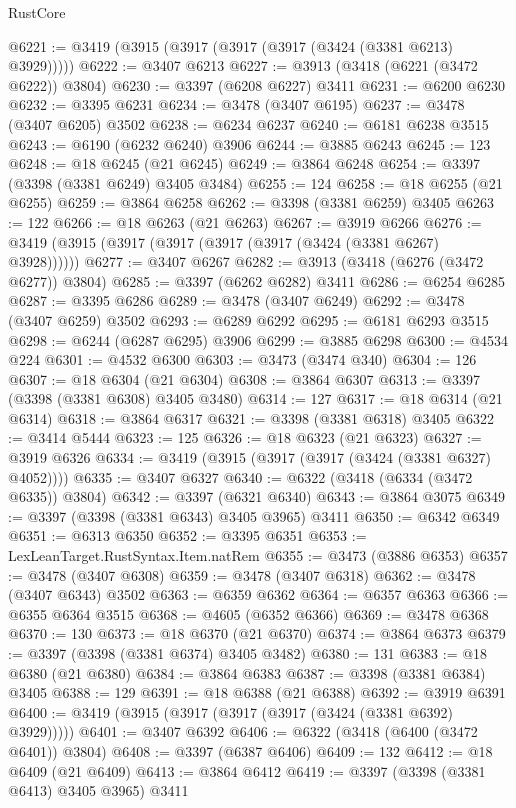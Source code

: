 \begin{lexlean}{RustCore}
\begin{coremodule}
@6221 := @3419 (@3915 (@3917 (@3917 (@3917 (@3424 (@3381 @6213) @3929)))))
@6222 := @3407 @6213
@6227 := @3913 (@3418 (@6221 (@3472 @6222)) @3804)
@6230 := @3397 (@6208 @6227) @3411
@6231 := @6200 @6230
@6232 := @3395 @6231
@6234 := @3478 (@3407 @6195)
@6237 := @3478 (@3407 @6205) @3502
@6238 := @6234 @6237
@6240 := @6181 @6238 @3515
@6243 := @6190 (@6232 @6240) @3906
@6244 := @3885 @6243
@6245 := 123
@6248 := @18 @6245 (@21 @6245)
@6249 := @3864 @6248
@6254 := @3397 (@3398 (@3381 @6249) @3405 @3484)
@6255 := 124
@6258 := @18 @6255 (@21 @6255)
@6259 := @3864 @6258
@6262 := @3398 (@3381 @6259) @3405
@6263 := 122
@6266 := @18 @6263 (@21 @6263)
@6267 := @3919 @6266
@6276 := @3419 (@3915 (@3917 (@3917 (@3917 (@3917 (@3424 (@3381 @6267) @3928))))))
@6277 := @3407 @6267
@6282 := @3913 (@3418 (@6276 (@3472 @6277)) @3804)
@6285 := @3397 (@6262 @6282) @3411
@6286 := @6254 @6285
@6287 := @3395 @6286
@6289 := @3478 (@3407 @6249)
@6292 := @3478 (@3407 @6259) @3502
@6293 := @6289 @6292
@6295 := @6181 @6293 @3515
@6298 := @6244 (@6287 @6295) @3906
@6299 := @3885 @6298
@6300 := @4534 @224
@6301 := @4532 @6300
@6303 := @3473 (@3474 @340)
@6304 := 126
@6307 := @18 @6304 (@21 @6304)
@6308 := @3864 @6307
@6313 := @3397 (@3398 (@3381 @6308) @3405 @3480)
@6314 := 127
@6317 := @18 @6314 (@21 @6314)
@6318 := @3864 @6317
@6321 := @3398 (@3381 @6318) @3405
@6322 := @3414 @5444
@6323 := 125
@6326 := @18 @6323 (@21 @6323)
@6327 := @3919 @6326
@6334 := @3419 (@3915 (@3917 (@3917 (@3424 (@3381 @6327) @4052))))
@6335 := @3407 @6327
@6340 := @6322 (@3418 (@6334 (@3472 @6335)) @3804)
@6342 := @3397 (@6321 @6340)
@6343 := @3864 @3075
@6349 := @3397 (@3398 (@3381 @6343) @3405 @3965) @3411
@6350 := @6342 @6349
@6351 := @6313 @6350
@6352 := @3395 @6351
@6353 := LexLeanTarget.RustSyntax.Item.natRem
@6355 := @3473 (@3886 @6353)
@6357 := @3478 (@3407 @6308)
@6359 := @3478 (@3407 @6318)
@6362 := @3478 (@3407 @6343) @3502
@6363 := @6359 @6362
@6364 := @6357 @6363
@6366 := @6355 @6364 @3515
@6368 := @4605 (@6352 @6366)
@6369 := @3478 @6368
@6370 := 130
@6373 := @18 @6370 (@21 @6370)
@6374 := @3864 @6373
@6379 := @3397 (@3398 (@3381 @6374) @3405 @3482)
@6380 := 131
@6383 := @18 @6380 (@21 @6380)
@6384 := @3864 @6383
@6387 := @3398 (@3381 @6384) @3405
@6388 := 129
@6391 := @18 @6388 (@21 @6388)
@6392 := @3919 @6391
@6400 := @3419 (@3915 (@3917 (@3917 (@3917 (@3424 (@3381 @6392) @3929)))))
@6401 := @3407 @6392
@6406 := @6322 (@3418 (@6400 (@3472 @6401)) @3804)
@6408 := @3397 (@6387 @6406)
@6409 := 132
@6412 := @18 @6409 (@21 @6409)
@6413 := @3864 @6412
@6419 := @3397 (@3398 (@3381 @6413) @3405 @3965) @3411

\end{coremodule}
\end{lexlean}
